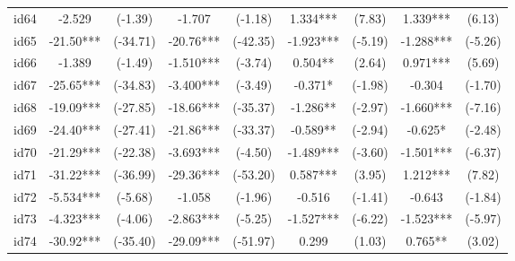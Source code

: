 \documentclass[entropy,article,submit,moreauthors,LaTeX and dvi2pdf]{Definitions/mdpi}
\begin{document}
\begin{center}
\begin{longtable}{ccccccccc}
id64                                          & -2.529        & (-1.39)       & -1.707          & (-1.18)          & 1.334***          & (7.83)            & 1.339***          & (6.13)            \\
id65                                          & -21.50***     & (-34.71)      & -20.76***       & (-42.35)         & -1.923***         & (-5.19)           & -1.288***         & (-5.26)           \\
id66                                          & -1.389        & (-1.49)       & -1.510***       & (-3.74)          & 0.504**           & (2.64)            & 0.971***          & (5.69)            \\
id67                                          & -25.65***     & (-34.83)      & -3.400***       & (-3.49)          & -0.371*           & (-1.98)           & -0.304            & (-1.70)           \\
id68                                          & -19.09***     & (-27.85)      & -18.66***       & (-35.37)         & -1.286**          & (-2.97)           & -1.660***         & (-7.16)           \\
id69                                          & -24.40***     & (-27.41)      & -21.86***       & (-33.37)         & -0.589**          & (-2.94)           & -0.625*           & (-2.48)           \\
id70                                          & -21.29***     & (-22.38)      & -3.693***       & (-4.50)          & -1.489***         & (-3.60)           & -1.501***         & (-6.37)           \\
id71                                          & -31.22***     & (-36.99)      & -29.36***       & (-53.20)         & 0.587***          & (3.95)            & 1.212***          & (7.82)            \\
id72                                          & -5.534***     & (-5.68)       & -1.058          & (-1.96)          & -0.516            & (-1.41)           & -0.643            & (-1.84)           \\
id73                                          & -4.323***     & (-4.06)       & -2.863***       & (-5.25)          & -1.527***         & (-6.22)           & -1.523***         & (-5.97)           \\
id74                                          & -30.92***     & (-35.40)      & -29.09***       & (-51.97)         & 0.299             & (1.03)            & 0.765**           & (3.02)            \\

\end{longtable}
\end{center}
\end{document}

